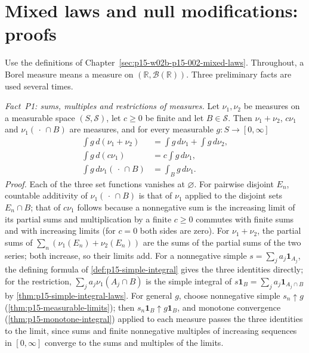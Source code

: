 \section{Mixed laws and null modifications: proofs}
\label{sec:annex-p15-w02b-p15-002-mixed-laws}

Use the definitions of
Chapter~\ref{sec:p15-w02b-p15-002-mixed-laws}. Throughout, a Borel
measure means a measure on \((\mathbb R,\mathcal B(\mathbb R))\). Three
preliminary facts are used several times.

\emph{Fact~P1: sums, multiples and restrictions of measures.} Let
\(\nu_1,\nu_2\) be measures on a measurable space
\((S,\mathcal S)\), let \(c\geq0\) be finite and let \(B\in\mathcal S\).
Then \(\nu_1+\nu_2\), \(c\nu_1\) and \(\nu_1(\,\cdot\,\cap B)\) are
measures, and for every measurable \(g:S\to[0,\infty]\)
\[
 \begin{aligned}
 \int g\,d(\nu_1+\nu_2)&=\int g\,d\nu_1+\int g\,d\nu_2,\\
 \int g\,d(c\nu_1)&=c\int g\,d\nu_1,\\
 \int g\,d\nu_1(\,\cdot\,\cap B)&=\int_B g\,d\nu_1 .
 \end{aligned}
\]
\emph{Proof.} Each of the three set functions vanishes at
\(\varnothing\). For pairwise disjoint \(E_n\), countable additivity of
\(\nu_1(\,\cdot\,\cap B)\) is that of \(\nu_1\) applied to the disjoint
sets \(E_n\cap B\); that of \(c\nu_1\) follows because a nonnegative sum
is the increasing limit of its partial sums and multiplication by a
finite \(c\geq0\) commutes with finite sums and with increasing limits
(for \(c=0\) both sides are zero). For \(\nu_1+\nu_2\), the partial sums
of \(\sum_n(\nu_1(E_n)+\nu_2(E_n))\) are the sums of the partial sums of
the two series; both increase, so their limits add. For a nonnegative
simple \(s=\sum_ja_j\mathbf1_{A_j}\), the defining formula of
\cref{def:p15-simple-integral} gives the three identities directly; for
the restriction, \(\sum_ja_j\nu_1(A_j\cap B)\) is the simple integral of
\(s\mathbf1_B=\sum_ja_j\mathbf1_{A_j\cap B}\) by
\cref{thm:p15-simple-integral-laws}. For general \(g\), choose
nonnegative simple \(s_n\uparrow g\) (\cref{thm:p15-measurable-limits});
then \(s_n\mathbf1_B\uparrow g\mathbf1_B\), and monotone convergence
(\cref{thm:p15-monotone-integral}) applied to each measure passes the
three identities to the limit, since sums and finite nonnegative
multiples of increasing sequences in \([0,\infty]\) converge to the sums
and multiples of the limits.

